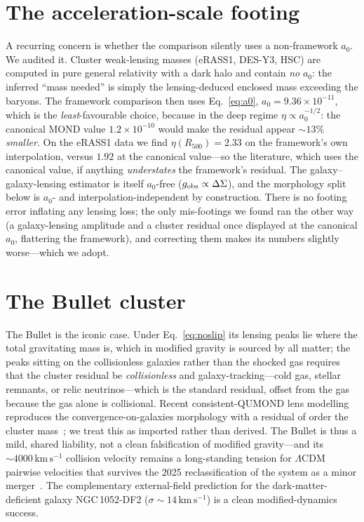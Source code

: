 \documentclass[aps,prd,twocolumn,10pt,nofootinbib,superscriptaddress]{revtex4-2}
\begin{document}
\section{The acceleration-scale footing}
A recurring concern is whether the comparison silently uses a non-framework $a_0$. We audited it. Cluster
weak-lensing masses (eRASS1, DES-Y3, HSC) are computed in pure general relativity with a dark halo and contain
\emph{no} $a_0$: the inferred ``mass needed'' is simply the lensing-deduced enclosed mass exceeding the baryons. The
framework comparison then uses Eq.~\eqref{eq:a0}, $a_0=9.36\times10^{-11}$, which is the \emph{least}-favourable
choice, because in the deep regime $\eta\!\propto\!a_0^{-1/2}$: the canonical MOND value $1.2\times10^{-10}$ would make
the residual appear $\sim13\%$ \emph{smaller}. On the eRASS1 data we find $\eta(R_{500})=2.33$ on the framework's own
interpolation, versus $1.92$ at the canonical value---so the literature, which uses the canonical value, if anything
\emph{understates} the framework's residual. The galaxy--galaxy-lensing estimator is itself $a_0$-free ($g_{\rm
obs}\propto\Delta\Sigma$), and the morphology split below is $a_0$- and interpolation-independent by construction.
There is no footing error inflating any lensing loss; the only mis-footings we found ran the other way (a
galaxy-lensing amplitude and a cluster residual once displayed at the canonical $a_0$, flattering the framework), and
correcting them makes its numbers slightly worse---which we adopt.

\section{The Bullet cluster}
The Bullet is the iconic case. Under Eq.~\eqref{eq:noslip} its lensing peaks lie where the total gravitating mass is,
which in modified gravity is sourced by all matter; the peaks sitting on the collisionless galaxies rather than the
shocked gas requires that the cluster residual be \emph{collisionless} and galaxy-tracking---cold gas, stellar
remnants, or relic neutrinos---which is the standard residual, offset from the gas because the gas alone is
collisional. Recent consistent-QUMOND lens modelling reproduces the convergence-on-galaxies morphology with a residual
of order the cluster mass~\cite{Cha2026}; we treat this as imported rather than derived. The Bullet is thus a mild,
shared liability, not a clean falsification of modified gravity---and its $\sim4000\,\mathrm{km\,s^{-1}}$ collision
velocity remains a long-standing tension for $\Lambda$CDM pairwise velocities that survives the 2025 reclassification
of the system as a minor merger~\cite{JWSTbullet}. The complementary external-field prediction for the
dark-matter-deficient galaxy NGC\,1052-DF2 ($\sigma\!\sim\!14\,\mathrm{km\,s^{-1}}$) is a clean modified-dynamics
success.
\end{document}
